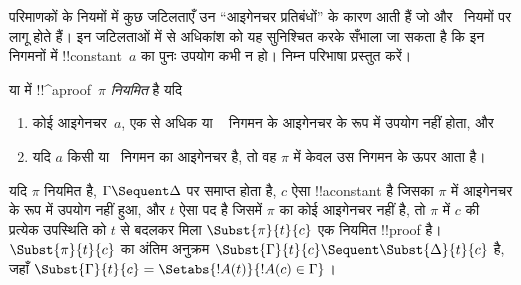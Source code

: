 \documentclass[../../../include/open-logic-section]{subfiles}
\begin{document}


परिमाणकों के नियमों में कुछ जटिलताएँ उन ``आइगेनचर प्रतिबंधों'' के कारण आती
हैं जो \LeftR{\lexists} और~\RightR{\lforall} नियमों पर लागू होते हैं। इन
जटिलताओं में से अधिकांश को यह सुनिश्चित करके सँभाला जा सकता है कि इन
निगमनों में !!{constant}~$a$ का पुनः उपयोग कभी न हो। निम्न परिभाषा प्रस्तुत
करें।

\begin{defn}
 या  में !!^a{proof}~$\pi$ \emph{नियमित} है यदि
\begin{enumerate}
  \item कोई आइगेनचर~$a$, एक से अधिक \LeftR{\lexists} या
  ~\RightR{\lforall} निगमन के आइगेनचर के रूप में उपयोग नहीं होता, और
  \item यदि $a$ किसी \LeftR{\lexists} या~\RightR{\lforall} निगमन का
  आइगेनचर है, तो वह $\pi$ में केवल उस निगमन के ऊपर आता है।
\end{enumerate}
\end{defn}

\begin{lem} यदि $\pi$ नियमित है, $\Gamma
\Sequent \Delta$ पर समाप्त होता है, $c$ ऐसा !!a{constant} है जिसका $\pi$
में आइगेनचर के रूप में उपयोग नहीं हुआ, और $t$ ऐसा पद है जिसमें $\pi$ का कोई
आइगेनचर नहीं है, तो $\pi$ में $c$ की प्रत्येक उपस्थिति को $t$ से बदलकर मिला
$\Subst{\pi}{t}{c}$ एक नियमित !!{proof} है। $\Subst{\pi}{t}{c}$ का अंतिम
अनुक्रम $\Subst{\Gamma}{t}{c} \Sequent \Subst{\Delta}{t}{c}$ है, जहाँ
$\Subst{\Gamma}{t}{c} = \Setabs{!A(t)}{!A(c) \in \Gamma}$।
\end{lem}
\end{document}
